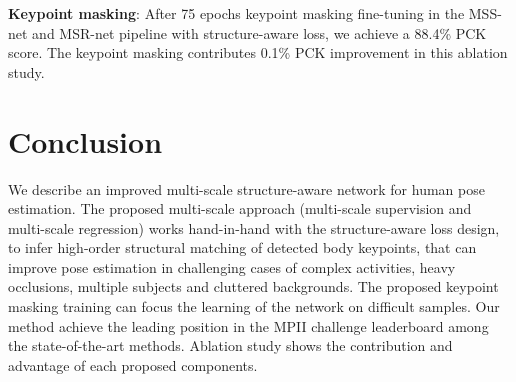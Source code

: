 \documentclass[runningheads]{llncs}
\begin{document}
{\bf Keypoint masking}: After 75 epochs keypoint masking fine-tuning in the MSS-net and MSR-net pipeline with structure-aware loss, we achieve a 88.4\% PCK score. The keypoint masking contributes 0.1\% PCK improvement in this ablation study.













\section{Conclusion}

We describe an improved multi-scale structure-aware network for human pose estimation.
The proposed multi-scale approach (multi-scale supervision and multi-scale regression) works hand-in-hand with the structure-aware loss design, to infer high-order structural matching of detected body keypoints, that can improve pose estimation in challenging cases of complex activities, heavy occlusions, multiple subjects and cluttered backgrounds.
The proposed keypoint masking training can focus the learning of the network on difficult samples.
Our method achieve the leading position in the MPII challenge leaderboard among the state-of-the-art methods. Ablation study shows the contribution and advantage of each proposed components.










\end{document}
